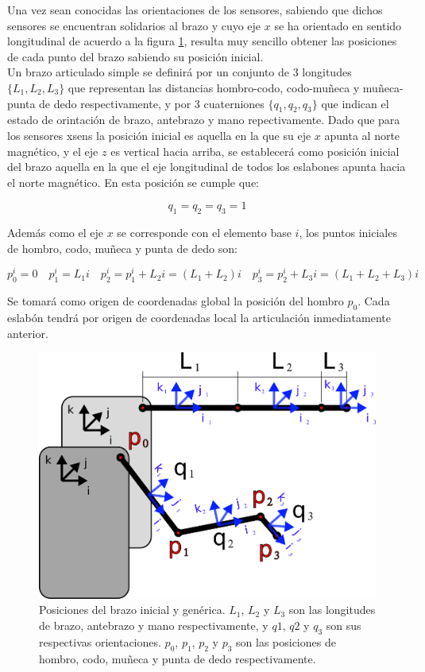 \documentclass[12pt, a4paper]{report}
\begin{document}
Una vez sean conocidas las orientaciones de los sensores, sabiendo que dichos sensores se encuentran solidarios al brazo y cuyo eje $x$ se ha orientado en sentido longitudinal de acuerdo a la figura \ref{fig: posiciones_brazo}, resulta muy sencillo obtener las posiciones de cada punto del brazo sabiendo su posición inicial. \\

Un brazo articulado simple se definirá por un conjunto de 3 longitudes $\{L_1, L_2, L_3\}$ que representan las distancias hombro-codo, codo-muñeca y muñeca-punta de dedo respectivamente, y por 3 cuaterniones $\{q_1, q_2, q_3\}$ que indican el estado de orintación de brazo, antebrazo y mano repectivamente. Dado que para los sensores xsens la posición inicial es aquella en la que su eje $x$ apunta al norte magnético, y el eje $z$ es vertical hacia arriba, se establecerá como posición inicial del brazo aquella en la que el eje longitudinal de todos los eslabones apunta hacia el norte magnético. En esta posición se cumple que:

$$ q_1 = q_2 = q_3 = 1 $$

Además como el eje $x$ se corresponde con el elemento base $i$, los puntos iniciales de hombro, codo, muñeca y punta de dedo son:

$$ p_0^i = 0 \quad p_1^i = L_1i \quad p_2^i = p_1^i + L_2i = (L_1 + L_2)i \quad p_3^i = p_2^i + L_3i = (L_1 + L_2 + L_3)i $$

Se tomará como origen de coordenadas global la posición del hombro $p_0$. Cada eslabón tendrá por origen de coordenadas local la articulación inmediatamente anterior.

\begin{figure}[h] 
	\centering
		\includegraphics[scale=0.6]{../img/arm_position.png} 
	\caption[Posiciones del brazo inicial y genérica]{Posiciones del brazo inicial y genérica. $L_1$, $L_2$ y $L_3$ son las longitudes de brazo, antebrazo y mano respectivamente, y $q1$, $q2$ y $q_3$ son sus respectivas orientaciones. $p_0$, $p_1$, $p_2$ y $p_3$ son las posiciones de hombro, codo, muñeca y punta de dedo respectivamente.}
	\label{fig: posiciones_brazo}
\end{figure}
\end{document}
